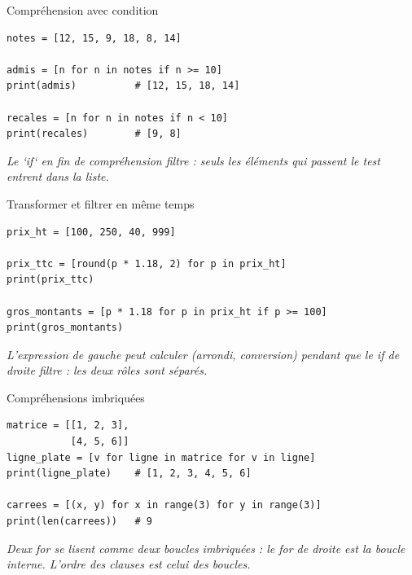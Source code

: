 \documentclass[aspectratio=169,11pt]{beamer}
\begin{document}
\begin{frame}[fragile]{Compréhension avec condition}

\begin{lstlisting}[style=py]
notes = [12, 15, 9, 18, 8, 14]

admis = [n for n in notes if n >= 10]
print(admis)          # [12, 15, 18, 14]

recales = [n for n in notes if n < 10]
print(recales)        # [9, 8]
\end{lstlisting}
\vspace{0.5pt}

{\small\color{PyGris}\itshape Le `if` en fin de compréhension filtre : seuls les éléments qui passent le test entrent dans la liste.}

\end{frame}

\begin{frame}[fragile]{Transformer et filtrer en même temps}

\begin{lstlisting}[style=py]
prix_ht = [100, 250, 40, 999]

prix_ttc = [round(p * 1.18, 2) for p in prix_ht]
print(prix_ttc)

gros_montants = [p * 1.18 for p in prix_ht if p >= 100]
print(gros_montants)
\end{lstlisting}
\vspace{0.5pt}

{\small\color{PyGris}\itshape L'expression de gauche peut calculer (arrondi, conversion) pendant que le if de droite filtre : les deux rôles sont séparés.}

\end{frame}

\begin{frame}[fragile]{Compréhensions imbriquées}

\begin{lstlisting}[style=py]
matrice = [[1, 2, 3],
           [4, 5, 6]]
ligne_plate = [v for ligne in matrice for v in ligne]
print(ligne_plate)    # [1, 2, 3, 4, 5, 6]

carrees = [(x, y) for x in range(3) for y in range(3)]
print(len(carrees))   # 9
\end{lstlisting}
\vspace{0.5pt}

{\small\color{PyGris}\itshape Deux for se lisent comme deux boucles imbriquées : le for de droite est la boucle interne. L'ordre des clauses est celui des boucles.}

\end{frame}
\end{document}
